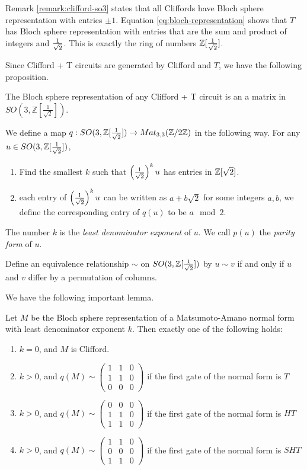 Remark \ref{remark:clifford-so3} states that all Cliffords have Bloch sphere representation with entries $\pm 1$. 
Equation \ref{eq:bloch-representation} shows that $T$ has Bloch sphere representation with entries that are the sum and product of integers and $\frac{1}{\sqrt{2}}$. This is exactly the ring of numbers $\mathbb{Z}[\frac{1}{\sqrt{2}}]$.

Since Clifford + T circuits are generated by Clifford and $T$, we have the following proposition.

\begin{proposition}
	The Bloch sphere representation of any Clifford + T circuit is an a matrix in $SO(3, \mathbb{Z}[\frac{1}{\sqrt{2}}])$.
\end{proposition}

We define a map $q: SO(3, \mathbb{Z}[\frac{1}{\sqrt{2}}]) \rightarrow Mat_{3, 3}(\mathbb{Z} / 2\mathbb{Z})$ in the following way. 
For any $u \in SO(3, \mathbb{Z}[\frac{1}{\sqrt{2}}])$, 
\begin{enumerate}
	\item Find the smallest $k$ such that $\left(\frac{1}{\sqrt{2}}\right)^k u$ has entries in $\mathbb{Z}[\sqrt{2}]$.
	\item each entry of $\left(\frac{1}{\sqrt{2}}\right)^k u$ can be written as $a + b\sqrt{2}$ for some integers $a, b$, we define the corresponding entry of $q(u)$ to be $a \mod 2$.
\end{enumerate}

The number $k$ is the \textit{least denominator exponent} of $u$.
We call $p(u)$ the \textit{parity form} of $u$.

Define an equivalence relationship $\sim$ on $SO(3, \mathbb{Z}[\frac{1}{\sqrt{2}}])$ by $u \sim v$ if and only if $u $ and $v$ differ by a permutation of columns.

We have the following important lemma.

\begin{lemma}
	Let $M$ be the Bloch sphere representation of a Matsumoto-Amano normal form with least denominator exponent $k$.
	Then exactly one of the following holds:
	\begin{enumerate}
		\item $k = 0$, and $M$ is Clifford. 
		\item $k > 0$, and $q(M) \sim \begin{pmatrix}
1 & 1 & 0 \\ 
1 & 1 & 0 \\ 
0 & 0 & 0
\end{pmatrix}$ if the first gate of the normal form is $T$
		\item $k > 0$, and $q(M) \sim \begin{pmatrix}
0 & 0 & 0 \\ 
1 & 1 & 0 \\ 
1 & 1 & 0
\end{pmatrix}$ if the first gate of the normal form is $HT$
		\item $k > 0$, and $q(M) \sim \begin{pmatrix}
1 & 1 & 0 \\ 
0 & 0 & 0 \\ 
1 & 1 & 0
\end{pmatrix}$ if the first gate of the normal form is $SHT$
	\end{enumerate}
\end{lemma}

